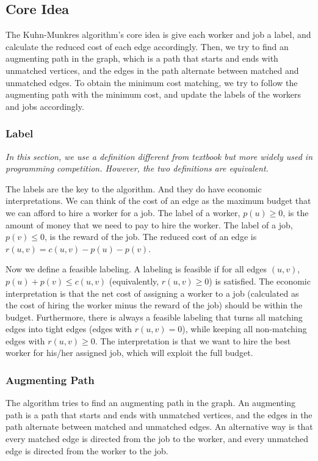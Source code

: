 \documentclass[a4paper,12pt]{article}
\begin{document}
\subsection{Core Idea}

The Kuhn-Munkres algorithm's core idea is give each worker and job a label, and calculate the reduced cost of each edge accordingly.
Then, we try to find an augmenting path in the graph, which is a path that starts and ends with unmatched vertices, and the edges in the path alternate between matched and unmatched edges.
To obtain the minimum cost matching, we try to follow the augmenting path with the minimum cost, and update the labels of the workers and jobs accordingly.

\subsubsection{Label}

\textit{In this section, we use a definition different from textbook but more widely used in programming competition. However, the two definitions are equivalent.}

The labels are the key to the algorithm.
And they do have economic interpretations.
We can think of the cost of an edge as the maximum budget that we can afford to hire a worker for a job.
The label of a worker, $p(u) \geq 0$,  is the amount of money that we need to pay to hire the worker.
The label of a job, $p(v) \leq 0$, is the reward of the job.
The reduced cost of an edge is $r(u, v) = c(u, v) - p(u) - p(v)$.

Now we define a feasible labeling.
A labeling is feasible if for all edges $(u, v)$, $p(u) + p(v) \leq c(u, v)$ (equivalently, $r(u, v) \geq 0$) is satisfied.
The economic interpretation is that the net cost of assigning a worker to a job (calculated as the cost of hiring the worker minus the reward of the job) should be within the budget.
Furthermore, there is always a feasible labeling that turns all matching edges into tight edges (edges with $r(u, v) = 0$), while keeping all non-matching edges with $r(u, v) \geq 0$.
The interpretation is that we want to hire the best worker for his/her assigned job, which will exploit the full budget.

\subsubsection{Augmenting Path}

The algorithm tries to find an augmenting path in the graph.
An augmenting path is a path that starts and ends with unmatched vertices, and the edges in the path alternate between matched and unmatched edges.
An alternative way is that every matched edge is directed from the job to the worker, and every unmatched edge is directed from the worker to the job.
\end{document}
